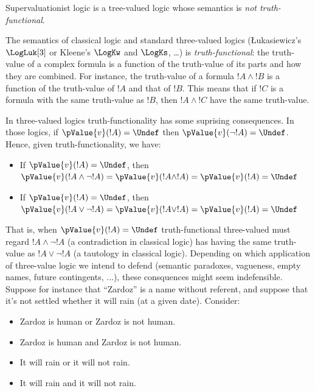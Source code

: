 \documentclass[../../../include/open-logic-section]{subfiles}
\begin{document}


Supervaluationist logic is a tree-valued logic whose semantics is \emph{not truth-functional}.

The semantics of classical logic and standard three-valued logics (\L ukasiewicz's $\LogLuk[3]$ or Kleene's $\LogKw$ and $\LogKs$, \ldots) is \emph{truth-functional}: the truth-value of a complex formula is a function of the truth-value of its parts and how they are combined. For instance, the truth-value of a formula $!A \land !B$ is a function of the truth-value of $!A$ and that of $!B$. This means that if $!C$ is a formula with the same truth-value as $!B$, then $!A \land !C$ have the same truth-value.  

In three-valued logics truth-functionality has some suprising consequences. In those logics, if $\pValue{v}(!A)=\Undef$ then $\pValue{v}(\lnot !A)=\Undef$. Hence, given truth-functionality, we have:

\begin{itemize}
	\item  If $\pValue{v}(!A) = \Undef$, then $\pValue{v}(!A \land \lnot !A)=\pValue{v}(!A \land !A)=\pValue{v}(!A) = \Undef$
	\item  If $\pValue{v}(!A) = \Undef$, then $\pValue{v}(!A \lor \lnot !A)=\pValue{v}(!A \lor !A)=\pValue{v}(!A) = \Undef$
\end{itemize}

That is, when $\pValue{v}(!A)=\Undef$ truth-functional three-valued must regard $!A \land \lnot !A$ (a contradiction in classical logic) has having the same truth-value as $!A \lor \lnot !A$ (a tautology in classical logic). Depending on which application of three-value logic we intend to defend (semantic paradoxes, vagueness, empty names, future contingents, ...), these consquences might seem indefensible. Suppose for instance that ``Zardoz'' is a name without referent, and suppose that it's not settled whether it will rain (at a given date). Consider:

\begin{itemize}
	\item Zardoz is human or Zardoz is not human.
	\item Zardoz is human and Zardoz is not human.
	\item It will rain or it will not rain.
	\item It will rain and it will not rain.
\end{itemize}
\end{document}
